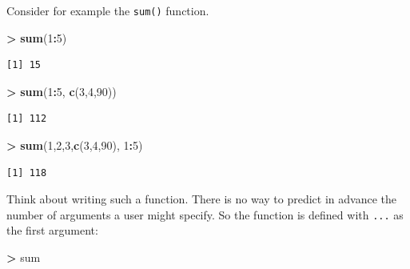 \documentclass[
]{krantz}
\makeatletter
\newenvironment{Shaded}{\begin{snugshade}}{\end{snugshade}}
\newcommand{\DecValTok}[1]{\textcolor[rgb]{0.06,0.06,0.06}{#1}}
\newcommand{\KeywordTok}[1]{\textcolor[rgb]{0.27,0.27,0.27}{\textbf{#1}}}
\newcommand{\NormalTok}[1]{#1}
\newcommand{\OperatorTok}[1]{\textcolor[rgb]{0.43,0.43,0.43}{\textbf{#1}}}
\newcommand{\StringTok}[1]{\textcolor[rgb]{0.5,0.5,0.5}{#1}}
\newenvironment{kframe}{%
\medskip{}
\setlength{\fboxsep}{.8em}
 \def\at@end@of@kframe{}%
 \ifinner\ifhmode%
  \def\at@end@of@kframe{\end{minipage}}%
  \begin{minipage}{\columnwidth}%
 \fi\fi%
 \def\FrameCommand##1{\hskip\@totalleftmargin \hskip-\fboxsep
 \colorbox{shadecolor}{##1}\hskip-\fboxsep
     \hskip-\linewidth \hskip-\@totalleftmargin \hskip\columnwidth}%
 \MakeFramed {\advance\hsize-\width
   \@totalleftmargin\z@ \linewidth\hsize
   \@setminipage}}%
 {\par\unskip\endMakeFramed%
 \at@end@of@kframe}
\renewenvironment{Shaded}{\begin{kframe}}{\end{kframe}}
\makeatother
\begin{document}
Consider for example the \texttt{sum()} function.

\begin{Shaded}
\begin{Highlighting}[]
\OperatorTok{\textgreater{}}\StringTok{ }\KeywordTok{sum}\NormalTok{(}\DecValTok{1}\OperatorTok{:}\DecValTok{5}\NormalTok{)}
\end{Highlighting}
\end{Shaded}

\begin{verbatim}
[1] 15
\end{verbatim}

\begin{Shaded}
\begin{Highlighting}[]
\OperatorTok{\textgreater{}}\StringTok{ }\KeywordTok{sum}\NormalTok{(}\DecValTok{1}\OperatorTok{:}\DecValTok{5}\NormalTok{, }\KeywordTok{c}\NormalTok{(}\DecValTok{3}\NormalTok{,}\DecValTok{4}\NormalTok{,}\DecValTok{90}\NormalTok{))}
\end{Highlighting}
\end{Shaded}

\begin{verbatim}
[1] 112
\end{verbatim}

\begin{Shaded}
\begin{Highlighting}[]
\OperatorTok{\textgreater{}}\StringTok{ }\KeywordTok{sum}\NormalTok{(}\DecValTok{1}\NormalTok{,}\DecValTok{2}\NormalTok{,}\DecValTok{3}\NormalTok{,}\KeywordTok{c}\NormalTok{(}\DecValTok{3}\NormalTok{,}\DecValTok{4}\NormalTok{,}\DecValTok{90}\NormalTok{), }\DecValTok{1}\OperatorTok{:}\DecValTok{5}\NormalTok{)}
\end{Highlighting}
\end{Shaded}

\begin{verbatim}
[1] 118
\end{verbatim}

Think about writing such a function. There is no way to predict in advance the number of arguments a user might specify. So the function is defined with \texttt{...} as the first argument:

\begin{Shaded}
\begin{Highlighting}[]
\OperatorTok{\textgreater{}}\StringTok{ }\NormalTok{sum}
\end{Highlighting}
\end{Shaded}
\end{document}
